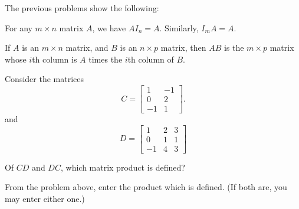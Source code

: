 


The previous problems show the following:

{}  
For any $m\times n$ matrix $A$, we have $AI_n = A$.  Similarly, $I_m A = A$.  

\endedxtext






\endedxvertical






{}  
If $A$ is an $m\times n$ matrix, and $B$ is an $n\times p$ matrix, then $AB$ is the $m\times p$ matrix
whose $i$th column is $A$ times the $i$th column of $B$.  

\endedxtext




Consider the matrices
\[ C = \left[\begin{array}{cc} 1 & -1 \\ 0 & 2  \\ -1 & 1  \end{array} \right]. \]
and 
\[ D = \left[\begin{array}{ccc} 1 & 2 & 3 \\ 0 & 1 & 1 \\ -1 & 4 & 3  \end{array} \right] \]

Of $CD$ and $DC$, which matrix product is defined?  




\endedxproblem




From the problem above, enter the product which is defined.  (If both are, you may enter either one.)  

